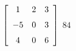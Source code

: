 {$\left[ \begin {array}{ccc} 1&2&3\\\noalign{\medskip}-5&0&3
\\\noalign{\medskip}4&0&6\end {array} \right]$} 
{$84$}



  

